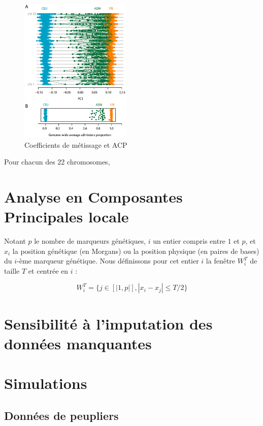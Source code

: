 \documentclass[12pt,twoside]{reedthesis}
\begin{document}
  \begin{figure}
  
  {\centering \includegraphics[width=200px]{figure/mcvean} 
  
  }
  
  \caption{Coefficients de métissage et ACP}\label{fig:mcvean}
  \end{figure}
  
  Pour chacun des 22 chromosomes,
  
  \section{Analyse en Composantes Principales
  locale}\label{analyse-en-composantes-principales-locale}
  
  Notant \(p\) le nombre de marqueurs génétiques, \(i\) un entier compris
  entre \(1\) et \(p\), et \(x_i\) la position génétique (en Morgans) ou
  la position physique (en paires de bases) du \(i\)-ème marqueur
  génétique. Nous définissons pour cet entier \(i\) la fenêtre \(W_i^T\)
  de taille \(T\) et centrée en \(i\) :
  
  \[W_i^T = \{ j \in [|1, p|], |x_i - x_j| \leq T/2 \}\]
  
  \section{Sensibilité à l'imputation des données
  manquantes}\label{sensibilite-a-limputation-des-donnees-manquantes}
  
  \section{Simulations}\label{simulations}
  
  \subsection{Données de peupliers}\label{donnees-de-peupliers}
  
\end{document}
